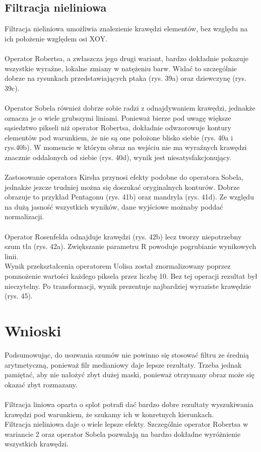 \documentclass{classrep}
\begin{document}
\subsection{Filtracja nieliniowa}
Filtracja nieliniowa umożliwia znalezienie krawędzi elementów, bez względu na ich położenie względem osi XOY.\\
\\
\indent
Operator Robertsa, a zwłaszcza jego drugi wariant, bardzo dokładnie pokazuje wszystkie wyraźne, lokalne zmiany w natężeniu barw. Widać to szczególnie dobrze na rysunkach przedstawiających ptaka (rys. 39a) oraz dziewczynę (rys. 39c).\\
\\
\indent
Operator Sobela również dobrze sobie radzi z odnajdywaniem krawędzi, jednakże oznacza je o wiele grubszymi liniami. Ponieważ bierze pod uwagę większe sąsiedztwo pikseli niż operator Robertsa, dokładnie odwzorowuje kontury elementów pod warunkiem, że nie są one położone blisko siebie (rys. 40a i rys.40b). W momencie w którym obraz na wejściu nie ma wyraźnych krawędzi znacznie oddalonych od siebie (rys. 40d), wynik jest niesatysfakcjonujący.\\
\\
\indent
Zastosowanie operatora Kirsha przynosi efekty podobne do operatora Sobela, jednakże jezcze trudniej można się doszukać oryginalnych konturów. Dobrze obrazuje to przykład Pentagonu (rys. 41b) oraz mandryla (rys. 41d). Ze względu na dużą jasność wszystkich wyników, dane wyjściowe możnaby poddać normalizacji.\\
\\
\indent
Operator Rosenfelda odnajduje krawędzi (rys. 42b) lecz tworzy niepotrzebny szum tła (rys. 42a). Zwiększanie parametru R powoduje pogrubianie wynikowych linii. 
\\
\indent
Wynik przekształcenia operatorem Uolisa został znormalizowany poprzez pomnożenie wartości każdego piksela przez liczbę 10. Bez tej operacji rezultat był nieczytelny. Po transformacji, wynik prezentuje najbardziej wyraziste krawędzie (rys. 45).

\section{Wnioski}
Podsumowując, do usuwania szumów nie powinno się stosować filtru ze średnią arytmetyczną, ponieważ filr medianiowy daje lepsze rezultaty. Trzeba jednak pamiętać, aby nie nałożyć zbyt dużej maski, ponieważ otrzymany obraz może się okazać zbyt rozmazany.\\
\\
\indent
Filtracja liniowa oparta o splot potrafi dać bardzo dobre rezultaty wyszukiwania krawędzi pod warunkiem, że szukamy ich w konretnych kierunkach.\\
\indent
Filtracja nieliniowa daje o wiele lepsze efekty. Szczególnie operator Robertsa w wariancie 2 oraz operator Sobela pozwalają na bardzo dokładne wyróżnienie wszystkich krawędzi.
\end{document}
